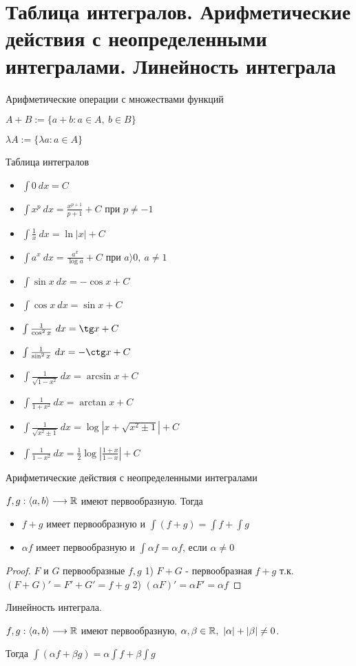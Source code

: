 \section{Таблица интегралов. Арифметические действия с неопределенными интегралами. Линейность интеграла \href{https://youtu.be/p9C57KDo1Yg?t=4373}{\Walley}}
\begin{conj}
    Арифметические операции с множествами функций

    $A+B := \{a+b: a \in A,\ b \in B\}$

    $\lambda A := \{ \lambda a : a \in A\}$
\end{conj}

Таблица интегралов

\begin{itemize}
    \item $\int 0\ dx = C$
    \item $\int x^p\ dx = \frac{x^{p+1}}{p+1} + C$ при $p \neq -1$
    \item $\int \frac{1}{x}\ dx = \ln |x| + C$
    \item $\int a^x\ dx = \frac{a^x}{\log a} + C$ при $a \rangle0,\ a\neq 1$
    \item $\int \sin x\ dx = -\cos x + C$
    \item $\int \cos x\ dx = \sin x + C$
    \item $\int \frac{1}{\cos^2 x}\ dx = \tg x + C$
    \item $\int \frac{1}{\sin^2 x}\ dx = -\ctg x + C$
    \item $\int \frac{1}{\sqrt{1-x^2}}\ dx = \arcsin x + C$
    \item $\int \frac{1}{1+x^2}\ dx = \arctan x + C$
    \item $\int \frac{1}{\sqrt{x^2\pm 1}}\ dx = \log|x+\sqrt{x^2\pm 1}| + C$
    \item $\int \frac{1}{1-x^2}\ dx = \frac{1}{2}\log |\frac{1+x}{1-x}| + C$   
\end{itemize}

Арифметические действия с неопределенными интегралами

    $f, g: \langle a, b \rangle \longrightarrow \mathbb{R}$ имеют первообразную. Тогда
    \begin{itemize}
        \item $f+g$ имеет первообразную и $\int(f+g) = \int f + \int g$
        \item $\alpha f$ имеет первообразную и $\int \alpha f = \alpha f$, если $\alpha \neq 0$
    \end{itemize}

\begin{proof}
    $F$ и $G$ первообразные $f, g$
    1) $F+G$ - первообразная $f+g$ т.к. $(F+G)'=F'+G'=f+g$
    2) $(\alpha F)' = \alpha F' = \alpha f$
\end{proof}

\follow \; Линейность интеграла.

$f, g: \langle a, b \rangle \longrightarrow \mathbb{R}$ имеют первообразную, $\alpha, \beta \in \mathbb{R},\ |\alpha|+|\beta|\neq 0$.

Тогда $\int (\alpha f + \beta g) = \alpha \int f + \beta \int g$